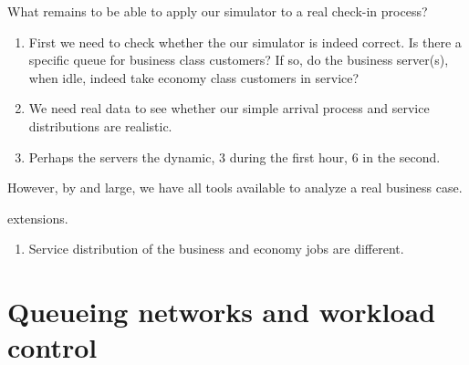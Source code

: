 \begin{exercise}
  What remains to be able to apply our simulator to a real check-in process?
  \begin{solution}
    \begin{enumerate}
    \item First we need to check whether the our simulator is indeed correct. Is there a specific queue for business class customers? If so, do the business server(s), when idle, indeed take economy class customers in service? 
    \item We need real data to see whether our simple arrival process and service distributions are realistic. 
    \item Perhaps the servers the dynamic, 3 during the first hour, 6 in the second. 
    \end{enumerate}

However, by and large, we have all tools available to analyze a real business case.
  \end{solution}
\end{exercise}

extensions.
\begin{enumerate}
\item Service distribution of the business and economy jobs are different.
\end{enumerate}











\section{Queueing networks and workload control}
\label{sec:queueing-network}

